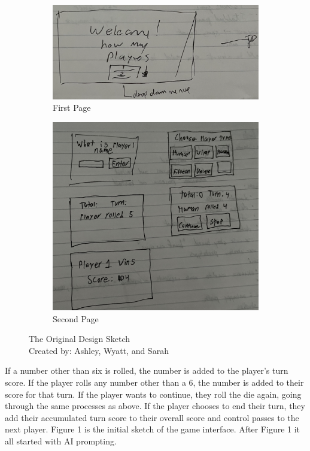 \documentclass[a4paper,11pt]{article}
\begin{document}
\begin{figure}[h]
    \centering
    \begin{subfigure}{0.45\textwidth}
        \centering
        \includegraphics[width=\textwidth]{Image1.png}
        \caption{First Page}
        \label{fig:first}
    \end{subfigure}
    \hfill
    \begin{subfigure}{0.45\textwidth}
        \centering
        \includegraphics[width=\textwidth]{Image2.png}
        \caption{Second Page}
        \label{fig:second}
    \end{subfigure}
    \caption{The Original Design Sketch \\ Created by: Ashley, Wyatt, and Sarah}
    \label{fig:two_images}
\end{figure}
If a number other than six is rolled, the number is added to the player's turn score. If the player rolls any number other than a 6, the number is added to their score for that turn. If the player wants to continue, they roll the die again, going through the same processes as above. If the player chooses to end their turn, they add their accumulated turn score to their overall score and control passes to the next player. Figure 1 is the initial sketch of the game interface. After Figure 1 it all started with AI prompting.\\
\end{document}
